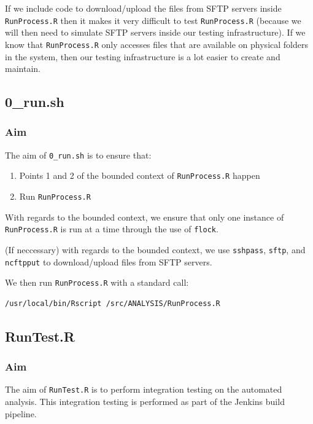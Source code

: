 \documentclass[12pt,]{article}
\providecommand{\tightlist}{%
  \setlength{\itemsep}{0pt}\setlength{\parskip}{0pt}}
\begin{document}
If we include code to download/upload the files from SFTP servers inside
\texttt{RunProcess.R} then it makes it very difficult to test
\texttt{RunProcess.R} (because we will then need to simulate SFTP
servers inside our testing infrastructure). If we know that
\texttt{RunProcess.R} only accesses files that are available on physical
folders in the system, then our testing infrastructure is a lot easier
to create and maintain.

\subsection{0\_run.sh}\label{run.sh}

\subsubsection{Aim}\label{aim-1}

The aim of \texttt{0\_run.sh} is to ensure that:

\begin{enumerate}
\def\labelenumi{\arabic{enumi}.}
\tightlist
\item
  Points 1 and 2 of the bounded context of \texttt{RunProcess.R} happen
\item
  Run \texttt{RunProcess.R}
\end{enumerate}

With regards to the bounded context, we ensure that only one instance of
\texttt{RunProcess.R} is run at a time through the use of
\texttt{flock}.

(If neccessary) with regards to the bounded context, we use
\texttt{sshpass}, \texttt{sftp}, and \texttt{ncftpput} to
download/upload files from SFTP servers.

We then run \texttt{RunProcess.R} with a standard call:

\begin{verbatim}
/usr/local/bin/Rscript /src/ANALYSIS/RunProcess.R
\end{verbatim}

\subsection{RunTest.R}\label{runtest.r}

\subsubsection{Aim}\label{aim-2}

The aim of \texttt{RunTest.R} is to perform integration testing on the
automated analysis. This integration testing is performed as part of the
Jenkins build pipeline.
\end{document}
